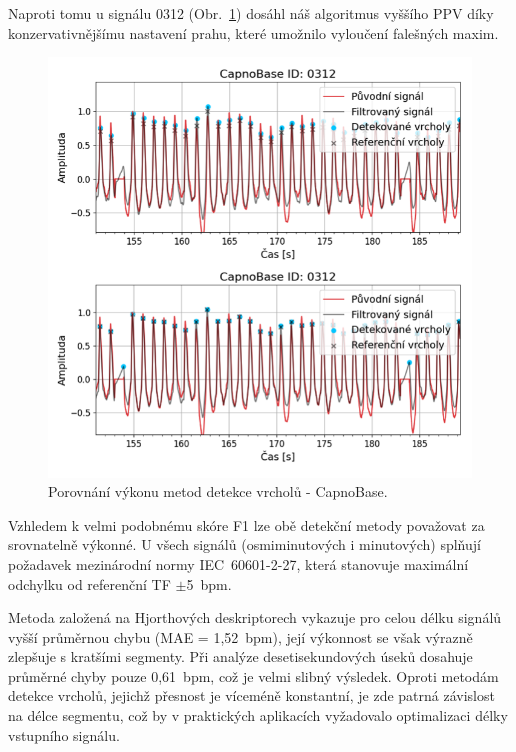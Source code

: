 Naproti tomu u signálu 0312 (Obr.~\ref{fig:our_elgendi_comparison}) dosáhl náš algoritmus vyššího \acs{PPV} díky konzervativnějšímu nastavení prahu, které umožnilo vyloučení falešných maxim.

\begin{figure}[ht]
	\centering
	\includegraphics[width=1\textwidth]{./obrazky/diskuze/PPV_our_elgendi.png}
	\caption[Porovnání výkonu metod detekce vrcholů - CapnoBase]{Porovnání výkonu metod detekce vrcholů - CapnoBase.}
	\label{fig:our_elgendi_comparison}
\end{figure}

Vzhledem k velmi podobnému skóre \acs{F1} lze obě detekční metody považovat za srovnatelně výkonné.
U všech signálů (osmiminutových i minutových) splňují požadavek mezinárodní normy IEC~60601-2-27, která stanovuje maximální odchylku od referenční \acs{TF} $\pm$5~\acs{bpm}.

Metoda založená na Hjorthových deskriptorech vykazuje pro celou délku signálů vyšší průměrnou chybu (\acs{MAE} = 1,52~\acs{bpm}), její výkonnost se však výrazně zlepšuje s kratšími segmenty.
Při analýze desetisekundových úseků dosahuje průměrné chyby pouze 0,61~\acs{bpm}, což je velmi slibný výsledek.
Oproti metodám detekce vrcholů, jejichž přesnost je víceméně konstantní, je zde patrná závislost na délce segmentu, což by v praktických aplikacích vyžadovalo optimalizaci délky vstupního signálu.

